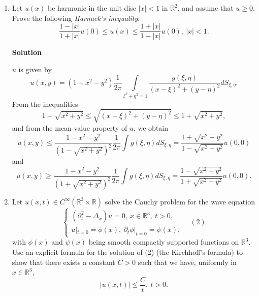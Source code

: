 \documentclass{article}
\begin{document}
\begin{enumerate}
{\bf Solution}

We use the method of characteristics, parametrizing the initial condition curve as \((s_1,s_2) \mapsto (s_1, s_2, 0, \phi(s_1,s_2))\).  The system of ODEs results in
\begin{eqnarray*}
x_1' & = & x_1; \\
x_2' & = & 2 x_2; \\
x_3' & = & 1; \\
z' & = & 3 z.
\end{eqnarray*}
All equations may be solved immediately, giving
\begin{eqnarray*}
x_1(t) & = & s_1 e^t; \\
x_2(t) & = & s_2 e^{2 t}; \\
x_3(t) & = & t; \\
z(t) & = & \phi(s_1,s_2) e^{3 t}.
\end{eqnarray*}
We can solve for \(s_1,s_2,t\) in terms of \(x_1,x_2,x_3\):
\[s_1 = x_1 e^{-x_3}; \ s_2 = x_2 e^{-2 x_3}; \ t = x_3.\]
The solution is thus
\[u(x_1,x_2,x_3) = z = \phi \left( x_1 e^{-x_3}, x_2 e^{-2 x_3} \right) e^{3 x_3}.\]



\item Let \(u(x)\) be harmonic in the unit disc \(|x| < 1\) in \(\mathbb{R}^2\), and assume that \(u \geq 0\).  Prove the following {\em Harnack's inequality}:
\[\frac{1 - |x|}{1 + |x|} u(0) \leq u(x) \leq \frac{1 + |x|}{1 - |x|} u(0), \ |x| < 1.\]

{\bf Solution}

\(u\) is given by
\[u(x,y) = (1 - x^2 - y^2) \frac{1}{2\pi} \int\limits_{\xi^2 + \eta^2 = 1} \frac{g(\xi,\eta)}{(x - \xi)^2 + (y - \eta)^2} dS_{\xi,\eta}.\]
From the inequalities
\[1 - \sqrt{x^2 + y^2} \leq \sqrt{(x - \xi)^2 + (y - \eta)^2} \leq 1 + \sqrt{x^2 + y^2},\]
and from the mean value property of \(u\), we obtain
\[u(x,y) \leq \frac{1 - x^2 - y^2}{\left( 1 - \sqrt{x^2 + y^2} \right)^2} \frac{1}{2\pi} \int g(\xi,\eta) dS_{\xi,\eta} = \frac{1 + \sqrt{x^2 + y^2}}{1 - \sqrt{x^2 + y^2}} u(0,0)\]
and
\[u(x,y) \geq \frac{1 - x^2 - y^2}{\left( 1 + \sqrt{x^2 + y^2} \right)^2} \frac{1}{2\pi} \int g(\xi,\eta) dS_{\xi,\eta} = \frac{1 - \sqrt{x^2 + y^2}}{1 + \sqrt{x^2 + y^2}} u(0,0).\]



\item Let \(u(x,t) \in C^{\infty}(\mathbb{R}^3 \times \mathbb{R})\) solve the Cauchy problem for the wave equation
\[\left\{ \begin{array}{l} \left( \partial_t^2 - \Delta_x \right) u = 0, \ x \in \mathbb{R}^3, \ t > 0, \\ u|_{t = 0} = \phi(x), \ \partial_t \phi|_{t = 0} = \psi(x), \end{array} \right. \ \ \ \ (2)\]
with \(\phi(x)\) and \(\psi(x)\) being smooth compactly supported functions on \(\mathbb{R}^3\).  Use an explicit formula for the solution of (2) (the Kirchhoff's formula) to show that there exists a constant \(C > 0\) such that we have, uniformly in \(x \in \mathbb{R}^3\),
\[|u(x,t)| \leq \frac{C}{t}, \ t > 0.\]


\end{enumerate}
\end{document}
